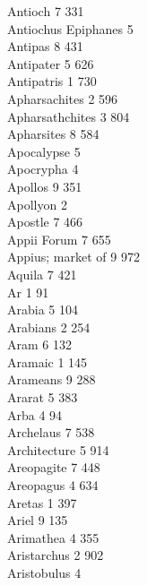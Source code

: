 Antioch \hfill 7 \quad \phantom{0}331\\
Antiochus Epiphanes \hfill 5 \\
Antipas \hfill 8 \quad \phantom{0}431\\
Antipater \hfill 5 \quad \phantom{0}626\\
Antipatris \hfill 1 \quad \phantom{0}730\\
Apharsachites \hfill 2 \quad \phantom{0}596\\
Apharsathchites \hfill 3 \quad \phantom{0}804\\
Apharsites \hfill 8 \quad \phantom{0}584\\
Apocalypse \hfill 5 \\
Apocrypha \hfill 4 \\
Apollos \hfill 9 \quad \phantom{0}351\\
Apollyon \hfill 2 \\
Apostle \hfill 7 \quad \phantom{0}466\\
Appii Forum \hfill 7 \quad \phantom{0}655\\
Appius; market of \hfill 9 \quad \phantom{0}972\\
Aquila \hfill 7 \quad \phantom{0}421\\
Ar \hfill 1 \quad \phantom{0}\phantom{0}91\\
Arabia \hfill 5 \quad \phantom{0}104\\
Arabians \hfill 2 \quad \phantom{0}254\\
Aram \hfill 6 \quad \phantom{0}132\\
Aramaic \hfill 1 \quad \phantom{0}145\\
Arameans \hfill 9 \quad \phantom{0}288\\
Ararat \hfill 5 \quad \phantom{0}383\\
Arba \hfill 4 \quad \phantom{0}\phantom{0}94\\
Archelaus \hfill 7 \quad \phantom{0}538\\
Architecture \hfill 5 \quad \phantom{0}914\\
Areopagite \hfill 7 \quad \phantom{0}448\\
Areopagus \hfill 4 \quad \phantom{0}634\\
Aretas \hfill 1 \quad \phantom{0}397\\
Ariel \hfill 9 \quad \phantom{0}135\\
Arimathea \hfill 4 \quad \phantom{0}355\\
Aristarchus \hfill 2 \quad \phantom{0}902\\
Aristobulus \hfill 4 \\
